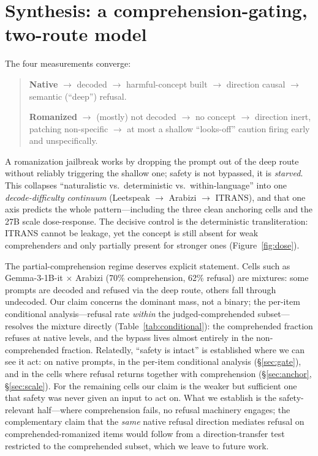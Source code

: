 \documentclass[11pt]{article}
\begin{document}
\section{Synthesis: a comprehension-gating, two-route model}
The four measurements converge:
\begin{quote}
\textbf{Native} $\rightarrow$ decoded $\rightarrow$ harmful-concept built $\rightarrow$ direction causal $\rightarrow$ semantic (``deep'') refusal.

\textbf{Romanized} $\rightarrow$ (mostly) not decoded $\rightarrow$ no concept $\rightarrow$ direction inert, patching non-specific $\rightarrow$ at most a shallow ``looks-off'' caution firing early and unspecifically.
\end{quote}
A romanization jailbreak works by dropping the prompt out of the deep route without reliably triggering the shallow one; safety is not bypassed, it is \emph{starved}. This collapses ``naturalistic vs.\ deterministic vs.\ within-language'' into one \emph{decode-difficulty continuum} (Leetspeak $\rightarrow$ Arabizi $\rightarrow$ ITRANS), and that one axis predicts the whole pattern---including the three clean anchoring cells and the 27B scale dose-response. The decisive control is the deterministic transliteration: ITRANS cannot be leakage, yet the concept is still absent for weak comprehenders and only partially present for stronger ones (Figure~\ref{fig:dose}).

The partial-comprehension regime deserves explicit statement. Cells such as Gemma-3-1B-it $\times$ Arabizi (70\% comprehension, 62\% refusal) are mixtures: some prompts are decoded and refused via the deep route, others fall through undecoded. Our claim concerns the dominant mass, not a binary; the per-item conditional analysis---refusal rate \emph{within} the judged-comprehended subset---resolves the mixture directly (Table~\ref{tab:conditional}): the comprehended fraction refuses at native levels, and the bypass lives almost entirely in the non-comprehended fraction. Relatedly, ``safety is intact'' is established where we can see it act: on native prompts, in the per-item conditional analysis (\S\ref{sec:gate}), and in the cells where refusal returns together with comprehension (\S\ref{sec:anchor}, \S\ref{sec:scale}). For the remaining cells our claim is the weaker but sufficient one that safety was never given an input to act on. What we establish is the safety-relevant half---where comprehension fails, no refusal machinery engages; the complementary claim that the \emph{same} native refusal direction mediates refusal on comprehended-romanized items would follow from a direction-transfer test restricted to the comprehended subset, which we leave to future work.
\end{document}
